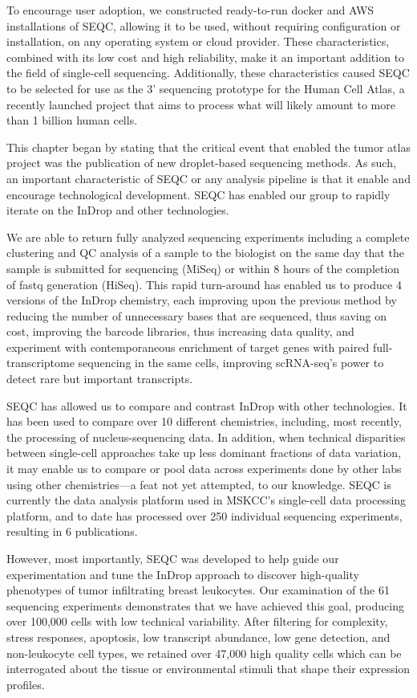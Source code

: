 To encourage user adoption, we constructed ready-to-run docker and AWS installations of SEQC, allowing it to be used, without requiring configuration or installation, on any operating system or cloud provider. 
These characteristics, combined with its low cost and high reliability, make it an important addition to the field of single-cell sequencing. 
Additionally, these characteristics caused SEQC to be selected for use as the 3' sequencing prototype for the Human Cell Atlas, a recently launched project that aims to process what will likely amount to more than 1 billion human cells.   

This chapter began by stating that the critical event that enabled the tumor atlas project was the publication of new droplet-based sequencing methods. 
As such, an important characteristic of SEQC or any analysis pipeline is that it enable and encourage technological development. 
SEQC has enabled our group to rapidly iterate on the InDrop and other technologies. 

We are able to return fully analyzed sequencing experiments including a complete clustering and QC analysis of a sample to the biologist on the same day that the sample is submitted for sequencing (MiSeq) or within 8 hours of the completion of fastq generation (HiSeq). 
This rapid turn-around has enabled us to produce 4 versions of the InDrop chemistry, each improving upon the previous method by reducing the number of unnecessary bases that are sequenced, thus saving on cost, improving the barcode libraries, thus increasing data quality, and experiment with contemporaneous enrichment of target genes with paired full-transcriptome sequencing in the same cells, improving scRNA-seq's power to detect rare but important transcripts. 

SEQC has allowed us to compare and contrast InDrop with other technologies. 
It has been used to compare over 10 different chemistries, including, most recently, the processing of nucleus-sequencing data. 
In addition, when technical disparities between single-cell approaches take up less dominant fractions of data variation, it may enable us to compare or pool data across experiments done by other labs using other chemistries---a feat not yet attempted, to our knowledge.
SEQC is currently the data analysis platform used in MSKCC's single-cell data processing platform, and to date has processed over 250 individual sequencing experiments, resulting in 6 publications. 

However, most importantly, SEQC was developed to help guide our experimentation and tune the InDrop approach to discover high-quality phenotypes of tumor infiltrating breast leukocytes. 
Our examination of the 61 sequencing experiments demonstrates that we have achieved this goal, producing over 100,000 cells with low technical variability.
After filtering for complexity, stress responses, apoptosis, low transcript abundance, low gene detection, and non-leukocyte cell types, we retained over 47,000 high quality cells which can be interrogated about the tissue or environmental stimuli that shape their expression profiles.
